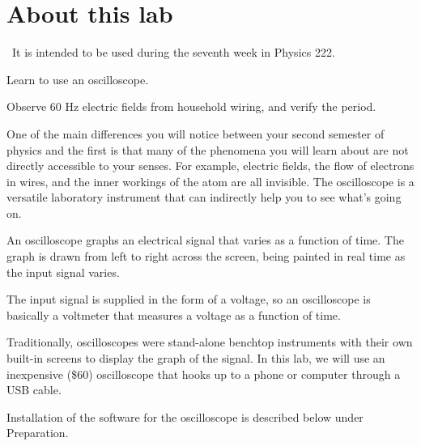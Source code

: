 \renewcommand\thechapter{c2.7}
\label{lab:covid-oscilloscope}

\section*{About this lab}

\covid\ 
It is intended to be used during the seventh week in Physics 222.

\apparatus
{}

\begin{goals}

\item[] Learn to use an oscilloscope.

\item[] Observe 60 Hz electric fields from household wiring, and verify the period.

\end{goals}

\introduction

One of the main differences you will notice between your
second semester of physics and the first is that many of the
phenomena you will learn about are not directly accessible
to your senses. For example, electric fields, the flow of
electrons in wires, and the inner workings of the atom are
all invisible.  The oscilloscope is a versatile laboratory
instrument that can indirectly help you to see what's going on. 


An oscilloscope graphs an electrical signal that varies as
a function of time.
The graph is drawn from left to right across the screen,
being painted in real time as the input signal varies.

The input signal is
supplied in the form of a voltage, so an oscilloscope is
basically a voltmeter that measures a voltage as a function of
time.

Traditionally, oscilloscopes were stand-alone benchtop instruments
with their own built-in screens to display the graph of the signal.
In this lab, we will use an inexpensive (\$60) oscilloscope that
hooks up to a phone or computer through a USB cable.


Installation of the software for the oscilloscope is described below
under Preparation.


